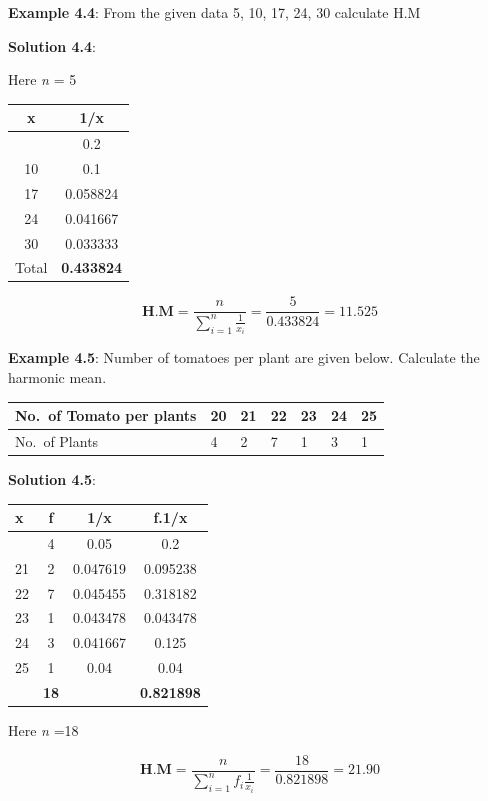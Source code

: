 \documentclass[
]{book}
\begin{document}
\textbf{Example 4.4}: From the given data 5, 10, 17, 24, 30 calculate H.M

\textbf{Solution 4.4}:

Here \emph{n} = 5

\begin{longtable}[]{@{}cc@{}}
\toprule\noalign{}
x & 1/x \\
\midrule\noalign{}
\endhead
\bottomrule\noalign{}
\endlastfoot
5 & 0.2 \\
10 & 0.1 \\
17 & 0.058824 \\
24 & 0.041667 \\
30 & 0.033333 \\
Total & \textbf{0.433824} \\
\end{longtable}

\[\mathbf{\text{H.M}} = \frac{n}{\sum_{i = 1}^{n}\frac{1}{x_{i}}} = \frac{5}{0.433824} = 11.525\]

\textbf{Example 4.5}: Number of tomatoes per plant are given below. Calculate
the harmonic mean.

\begin{longtable}[]{@{}lllllll@{}}
\toprule\noalign{}
No.~of Tomato per plants & 20 & 21 & 22 & 23 & 24 & 25 \\
\midrule\noalign{}
\endhead
\bottomrule\noalign{}
\endlastfoot
No.~of Plants & 4 & 2 & 7 & 1 & 3 & 1 \\
\end{longtable}

\textbf{Solution 4.5}:

\begin{longtable}[]{@{}lccc@{}}
\toprule\noalign{}
x & f & 1/x & f.1/x \\
\midrule\noalign{}
\endhead
\bottomrule\noalign{}
\endlastfoot
20 & 4 & 0.05 & 0.2 \\
21 & 2 & 0.047619 & 0.095238 \\
22 & 7 & 0.045455 & 0.318182 \\
23 & 1 & 0.043478 & 0.043478 \\
24 & 3 & 0.041667 & 0.125 \\
25 & 1 & 0.04 & 0.04 \\
& \textbf{18} & & \textbf{0.821898} \\
\end{longtable}

Here \emph{n} =18

\[\mathbf{\text{H.M}} = \frac{n}{\sum_{i = 1}^{n}{f_{i}\frac{1}{x_{i}}}} = \frac{18}{0.821898} = 21.90\]
\end{document}
